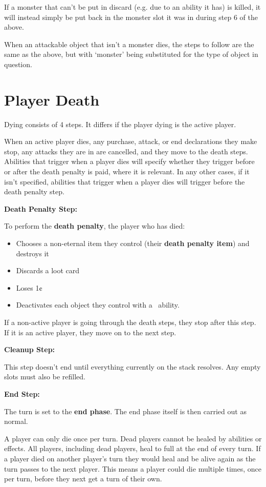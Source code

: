 \documentclass[
  fontsize=10pt,
  paper=a5,
  version=last,
  chapterprefix=true,
  bindingoffset=5mm,
  ]{scrbook}
\newcommand*{\inlineicon}[1]{%
    \raisebox{-.3\baselineskip}{%
        \smash{%
            \texttt{[image: \#1]}%
        }%
    }%
}
\newcommand{\tap}{\inlineicon{./assets/ms-tap.png}}
\begin{document}
    If a monster that can’t be put in discard (e.g. due to an ability it has) is killed, it will instead simply be put back in the monster slot it was in during step 6 of the above.

    When an attackable object that isn’t a monster dies, the steps to follow are the same as the above, but with ‘monster’ being substituted for the type of object in question.

    \section{Player Death}
    Dying consists of 4 steps. It differs if the player dying is the active player.

    When an active player dies, any purchase, attack, or end declarations they make stop, any attacks they are in are cancelled, and they move to the death steps. Abilities that trigger when a player dies will specify whether they trigger before or after the death penalty is paid, where it is relevant. In any other cases, if it isn’t specified, abilities that trigger when a player dies will trigger before the death penalty step.

    \textbf{Death Penalty Step:}

    To perform the \textbf{death penalty}, the player who has died:
    \begin{itemize}
        \item Chooses a non-eternal item they control (their \textbf{death penalty item}) and destroys it
        \item Discards a loot card
        \item Loses 1¢
        \item Deactivates each object they control with a \tap\ ability.
    \end{itemize}
    If a non-active player is going through the death steps, they stop after this step. If it is an active player, they move on to the next step.

    \textbf{Cleanup Step:}

    This step doesn’t end until everything currently on the stack resolves. Any empty slots must also be refilled.

    \textbf{End Step:}

    The turn is set to the \textbf{end phase}. The end phase itself is then carried out as normal.

    A player can only die once per turn. Dead players cannot be healed by abilities or effects. All players, including dead players, heal to full at the end of every turn. If a player died on another player’s turn they would heal and be alive again as the turn passes to the next player. This means a player could die multiple times, once per turn, before they next get a turn of their own.
\end{document}
